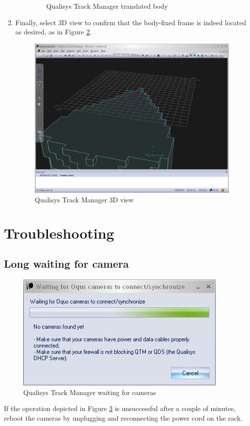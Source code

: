 \documentclass[a4paper,twoside,english]{report}
\begin{document}
\begin{enumerate}
\begin{enumerate}
\begin{figure}[!h]
\caption{\label{fig:Qualisys-Track-Managertranslated}Qualisys Track Manager translated body}
\end{figure}
\end{enumerate}
\item Finally, select 3D view to confirm that the body-fixed frame is indeed located as desired, as in Figure \ref{fig:Qualisys-Track-Managerr3D}.
\begin{figure}[!h]
\centering \includegraphics[width=1\textwidth]{fig/qualisys_3d} \caption{\label{fig:Qualisys-Track-Managerr3D}Qualisys Track Manager 3D view}
\end{figure}
\end{enumerate}

\section{Troubleshooting}
\subsection{Long waiting for camera}
\begin{figure}[!h]
\centering \includegraphics[scale=0.45]{fig/qualisys_waiting_to_connect}
\caption{\label{fig:Qualisys-Track-ManagerWaiting}Qualisys Track Manager waiting
for cameras}
\end{figure}
If the operation depicted in Figure \ref{fig:Qualisys-Track-ManagerWaiting}
is unsuccessful after a couple of minutes, reboot the cameras by unplugging
and reconnecting the power cord on the rack.
\end{document}
